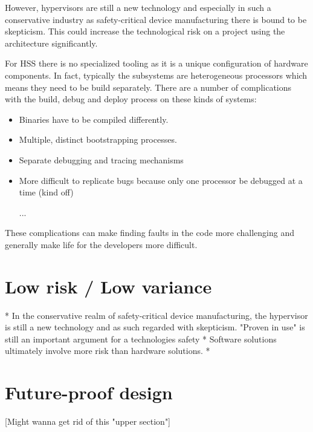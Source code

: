 However, hypervisors are still a new technology and especially in such a conservative industry as safety-critical device manufacturing there is bound to be skepticism. This could increase the technological risk on a project using the architecture significantly.

For \gls{HSS} there is no specialized tooling as it is a unique configuration of hardware components. In fact, typically the subsystems are heterogeneous processors which means they need to be build separately. There are a number of complications with the build, debug and deploy process on these kinds of systems:
\begin{itemize}
\item Binaries have to be compiled differently.
\item Multiple, distinct bootstrapping processes. %
\item Separate debugging and tracing mechanisms %
\item More difficult to replicate bugs because only one processor be debugged at a time (kind off)
\item [...]
\end{itemize}
These complications can make finding faults in the code more challenging and generally make life for the developers more difficult.


\section{Low risk / Low variance}
* In the conservative realm of safety-critical device manufacturing, the hypervisor is still a new technology and as such regarded with skepticism. "Proven in use" is still an important argument for a technologies safety
* Software solutions ultimately involve more risk than hardware solutions.
* 


\section{Future-proof design}
[Might wanna get rid of this "upper section"]


